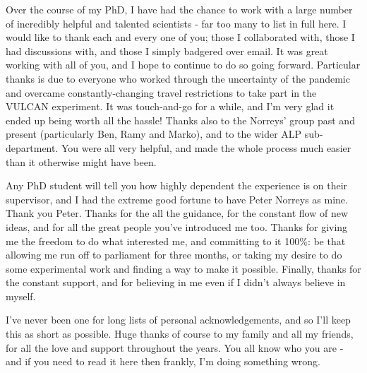 
Over the course of my PhD, I have had the chance to work with a large number of incredibly helpful and talented scientists - far too many to list in full here. I would like to thank each and every one of you; those I collaborated with, those I had discussions with, and those I simply badgered over email. It was great working with all of you, and I hope to continue to do so going forward. Particular thanks is due to everyone who worked through the uncertainty of the pandemic and overcame constantly-changing travel restrictions to take part in the VULCAN experiment. It was touch-and-go for a while, and I'm very glad it ended up being worth all the hassle! Thanks also to the Norreys' group past and present (particularly Ben, Ramy and Marko), and to the wider ALP sub-department. You were all very helpful, and made the whole process much easier than it otherwise might have been.

Any PhD student will tell you how highly dependent the experience is on their supervisor, and I had the extreme good fortune to have Peter Norreys as mine. Thank you Peter. Thanks for the all the guidance, for the constant flow of new ideas, and for all the great people you've introduced me too. Thanks for giving me the freedom to do what interested me, and committing to it 100\%: be that allowing me run off to parliament for three months, or taking my desire to do some experimental work and finding a way to make it possible. Finally, thanks for the constant support, and for believing in me even if I didn't always believe in myself.

I've never been one for long lists of personal acknowledgements, and so I'll keep this as short as possible. Huge thanks of course to my family and all my friends, for all the love and support throughout the years. You all know who you are - and if you need to read it here then frankly, I'm doing something wrong.


